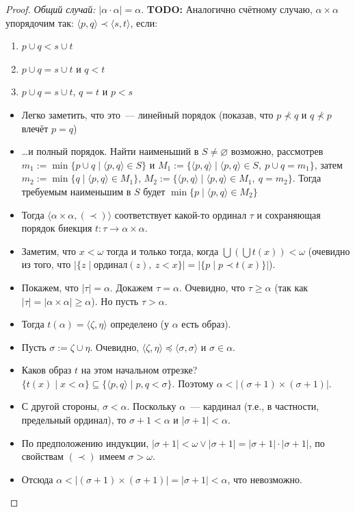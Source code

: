 \documentclass[a4paper,11pt]{article}
\theoremstyle{definition}
\newcommand{\todo}[1]{\textbf{TODO:} #1}
\begin{document}
\begin{proof}
\emph{Общий случай:} $|\alpha \cdot \alpha| = \alpha$. \todo{} Аналогично
счётному случаю, $\alpha \times \alpha$ упорядочим так: $\langle p, q\rangle
\prec \langle s, t\rangle$, если:
\begin{enumerate}
\item $p \cup q < s \cup t$
\item $p \cup q = s \cup t$ и $q < t$
\item $p \cup q = s \cup t$, $q = t$ и $p < s$
\end{enumerate}
\begin{itemize}
\item Легко заметить, что это~--- линейный порядок (показав, что $p \nprec q$ и
  $q \nprec p$ влечёт $p = q$)
\item \dots и полный порядок. Найти наименьший в $S \ne \varnothing$ возможно,
  рассмотрев $m_1 := \min\{p \cup q \mid \langle p, q\rangle \in S\}$ и $M_1 :=
  \{\langle p, q\rangle \mid \langle p, q\rangle \in S,\ p \cup q = m_1\}$,
  затем $m_2 := \min\{q \mid \langle p, q\rangle \in M_1\}$, $M_2 := \{\langle p,
  q\rangle \mid \langle p, q\rangle \in M_1,\ q = m_2\}$. Тогда требуемым
  наименьшим в $S$ будет $\min\{p \mid \langle p, q\rangle \in M_2\}$
\item Тогда $\langle\alpha \times \alpha, (\prec)\rangle$ соответствует какой-то
  ординал $\tau$ и сохраняющая порядок биекция $t : \tau \to \alpha \times
  \alpha$.
\item Заметим, что $x < \omega$ тогда и только тогда, когда $\bigcup(\bigcup
  t(x)) < \omega$ (очевидно из того, что $|\{z \mid \text{ординал}(z),\ z <
  x\}| = |\{p \mid p \prec t(x)\}|$).
\item Покажем, что $|\tau| = \alpha$. Докажем $\tau = \alpha$. Очевидно, что
  $\tau \ge \alpha$ (так как $|\tau| = |\alpha \times \alpha| \ge \alpha$). Но
  пусть $\tau > \alpha$.
\item Тогда $t(\alpha) = \langle\zeta, \eta\rangle$ определено (у $\alpha$ есть
  образ).
\item Пусть $\sigma := \zeta \cup \eta$. Очевидно, $\langle\zeta, \eta\rangle
  \preceq \langle\sigma, \sigma\rangle$ и $\sigma \in \alpha$.
\item Каков образ $t$ на этом начальном отрезке? $\{t(x) \mid x < \alpha\}
  \subseteq \{\langle p, q\rangle \mid p, q < \sigma\}$. Поэтому $\alpha <
  |(\sigma+1) \times (\sigma+1)|$.
\item С другой стороны, $\sigma < \alpha$. Поскольку $\alpha$~--- кардинал (т.е.,
  в частности, предельный ординал), то $\sigma + 1 < \alpha$ и $|\sigma + 1| <
  \alpha$.
\item По предположению индукции, $|\sigma + 1| < \omega \vee |\sigma + 1| =
  |\sigma + 1| \cdot |\sigma + 1|$, по свойствам $(\prec)$ имеем $\sigma >
  \omega$.
\item Отсюда $\alpha < |(\sigma+1) \times (\sigma+1)| = |\sigma + 1| < \alpha$,
  что невозможно.
\end{itemize}
\end{proof}
\end{document}
